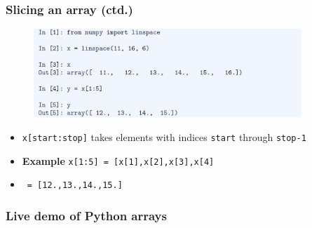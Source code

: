 \documentclass[english,14pt]{beamer}
\begin{document}

\begin{frame}[fragile]

\frametitle{Slicing an array (ctd.)}

\vspace*{-5mm}

\begin{figure}[ht]
	\centering
	\includegraphics[width=0.9\textwidth]{figures/LLp51}
\end{figure}

\vspace*{-5mm}

\begin{itemize}
	\item[] \texttt{x[start:stop]} takes elements with indices \texttt{start} through \texttt{stop-1}
	\item[] \textbf{Example} \texttt{x[1:5]~=~[x[1],x[2],x[3],x[4]}
	\item[] \qquad\qquad~\texttt{=~[12.,13.,14.,15.]}
%
\end{itemize}

\end{frame}


\begin{frame}[fragile]
\frametitle{Live demo of Python arrays}

\end{frame}
\end{document}
